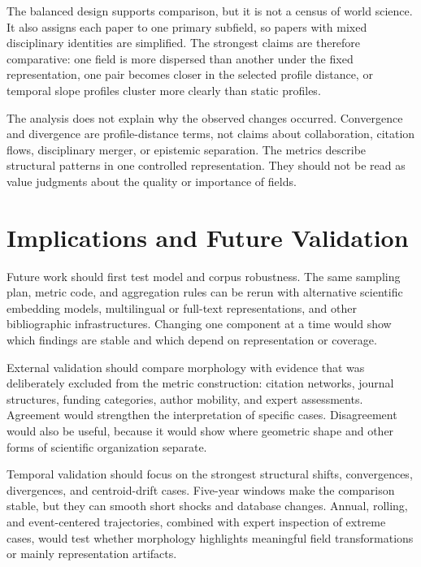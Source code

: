The balanced design supports comparison, but it is not a census of world science. It also assigns each paper to one primary subfield, so papers with mixed disciplinary identities are simplified. The strongest claims are therefore comparative: one field is more dispersed than another under the fixed representation, one pair becomes closer in the selected profile distance, or temporal slope profiles cluster more clearly than static profiles.

The analysis does not explain why the observed changes occurred. Convergence and divergence are profile-distance terms, not claims about collaboration, citation flows, disciplinary merger, or epistemic separation. The metrics describe structural patterns in one controlled representation. They should not be read as value judgments about the quality or importance of fields.

\section{Implications and Future Validation}

Future work should first test model and corpus robustness. The same sampling plan, metric code, and aggregation rules can be rerun with alternative scientific embedding models, multilingual or full-text representations, and other bibliographic infrastructures. Changing one component at a time would show which findings are stable and which depend on representation or coverage.

External validation should compare morphology with evidence that was deliberately excluded from the metric construction: citation networks, journal structures, funding categories, author mobility, and expert assessments. Agreement would strengthen the interpretation of specific cases. Disagreement would also be useful, because it would show where geometric shape and other forms of scientific organization separate.

Temporal validation should focus on the strongest structural shifts, convergences, divergences, and centroid-drift cases. Five-year windows make the comparison stable, but they can smooth short shocks and database changes. Annual, rolling, and event-centered trajectories, combined with expert inspection of extreme cases, would test whether morphology highlights meaningful field transformations or mainly representation artifacts.
